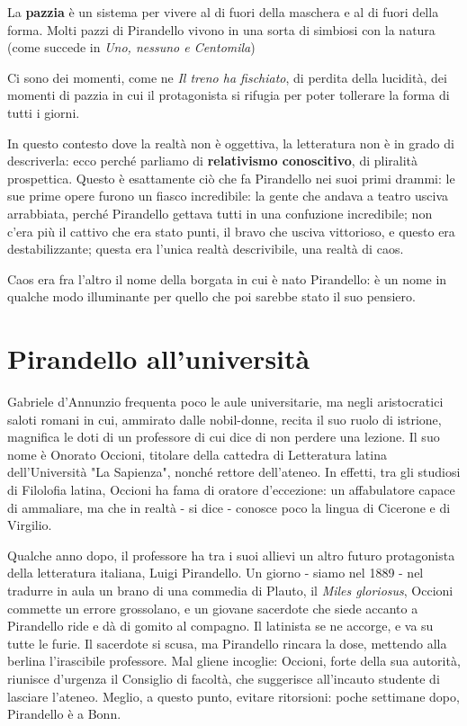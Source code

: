 \documentclass[a4paper, twoside, titlepage]{book}
\begin{document}
La \textbf{pazzia} è un sistema per vivere al di fuori della maschera e al di fuori della forma. Molti pazzi di Pirandello vivono in una sorta di simbiosi con la natura (come succede in \textit{Uno, nessuno e Centomila})

Ci sono dei momenti, come ne \textit{Il treno ha fischiato}, di perdita della lucidità, dei momenti di pazzia in cui il protagonista si rifugia per poter tollerare la forma di tutti i giorni.

In questo contesto dove la realtà non è oggettiva, la letteratura non è in grado di descriverla: ecco perché parliamo di \textbf{relativismo conoscitivo}, di pliralità prospettica.
Questo è esattamente ciò che fa Pirandello nei suoi primi drammi: le sue prime opere furono un fiasco incredibile: la gente che andava a teatro usciva arrabbiata, perché Pirandello gettava tutti in una confuzione incredibile; non c'era più il cattivo che era stato punti, il bravo che usciva vittorioso, e questo era destabilizzante; questa era l'unica realtà descrivibile, una realtà di caos.

Caos era fra l'altro il nome della borgata in cui è nato Pirandello: è un nome in qualche modo illuminante per quello che poi sarebbe stato il suo pensiero.

\section{Pirandello all'università}

Gabriele d'Annunzio frequenta poco le aule universitarie, ma negli aristocratici saloti romani in cui, ammirato dalle nobil-donne, recita il suo ruolo di istrione, magnifica le doti di un professore di cui dice di non perdere una lezione. Il suo nome è Onorato Occioni, titolare della cattedra di Letteratura latina dell'Università "La Sapienza", nonché rettore dell'ateneo. In effetti, tra gli studiosi di Filolofia latina, Occioni ha fama di oratore d'eccezione: un affabulatore capace di ammaliare, ma che in realtà - si dice - conosce poco la lingua di Cicerone e di Virgilio.

Qualche anno dopo, il professore ha tra i suoi allievi un altro futuro protagonista della letteratura italiana, Luigi Pirandello. Un giorno - siamo nel 1889 - nel tradurre in aula un brano di una commedia di Plauto, il \textit{Miles gloriosus}, Occioni commette un errore grossolano, e un giovane sacerdote che siede accanto a Pirandello ride e dà di gomito al compagno. Il latinista se ne accorge, e va su tutte le furie. Il sacerdote si scusa, ma Pirandello rincara la dose, mettendo alla berlina l'irascibile professore. Mal gliene incoglie: Occioni, forte della sua autorità, riunisce d'urgenza il Consiglio di facoltà, che suggerisce all'incauto studente di lasciare l'ateneo. Meglio, a questo punto, evitare ritorsioni: poche settimane dopo, Pirandello è a Bonn.
\end{document}
